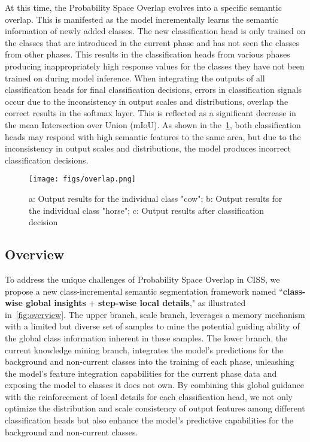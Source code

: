 At this time, the Probability Space Overlap evolves into a specific semantic overlap. This is manifested as the model incrementally learns the semantic information of newly added classes. The new classification head is only trained on the classes that are introduced in the current phase and has not seen the classes from other phases. This results in the classification heads from various phases producing inappropriately high response values for the classes they have not been trained on during model inference. When integrating the outputs of all classification heads for final classification decisions, errors in classification signals occur due to the inconsistency in output scales and distributions, overlap the correct results in the softmax layer. This is reflected as a significant decrease in the mean Intersection over Union (mIoU). As shown in the~\cref{fig:overlap}, both classification heads may respond with high semantic features to the same area, but due to the inconsistency in output scales and distributions, the model produces incorrect classification decisions.

\begin{figure}[ht]
    \centering
    \texttt{[image: figs/overlap.png]}
    \caption{a: Output results for the individual class "cow"; b: Output results for the individual class "horse"; c: Output results after classification decision}
    \label{fig:overlap}
\end{figure}

\fi
\subsection{Overview }
\label{sec3-2:Overview}


To address the unique challenges of Probability Space Overlap in CISS, we propose a new class-incremental semantic segmentation framework named ``\textbf{class-wise global insights} + \textbf{ step-wise local details}," as illustrated in~\cref{fig:overview}. The upper branch, scale branch, leverages a memory mechanism with a limited but diverse set of samples to mine the potential guiding ability of the global class information inherent in these samples. The lower branch, the current knowledge mining branch, integrates the model’s predictions for the background and non-current classes into the training of each phase, unleashing the model's feature integration capabilities for the current phase data and exposing the model to classes it does not own. By combining this global guidance with the reinforcement of local details for each classification head, we not only optimize the distribution and scale consistency of output features among different classification heads but also enhance the model’s predictive capabilities for the background and non-current classes. 

